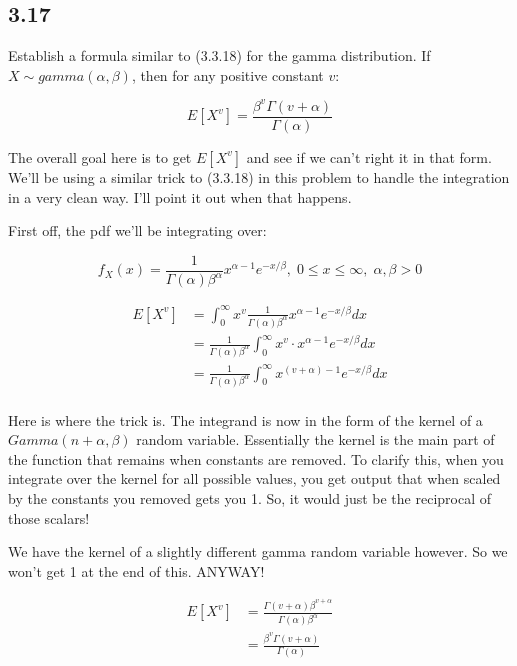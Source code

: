 \subsection*{3.17}

Establish a formula similar to (3.3.18) for the gamma distribution. If $X \sim gamma(\alpha, \beta)$, then for any positive constant $v$:

\[
	E[X^v] = \frac{\beta^v \Gamma(v + \alpha)}{\Gamma(\alpha)}
\]

The overall goal here is to get $E[X^v]$ and see if we can't right it in that form. We'll be using a similar trick to (3.3.18) in this problem to handle the integration in a very clean way. I'll point it out when that happens.

First off, the pdf we'll be integrating over:

\[
	f_X(x) = \frac{1}{\Gamma(\alpha)\beta^{\alpha}} x^{\alpha - 1} e^{-x/\beta}, \; 0 \leq x \leq \infty, \; \alpha, \beta > 0
\]

\begin{align*}
	E[X^v] &= \int_0^{\infty} x^v \frac{1}{\Gamma(\alpha)\beta^{\alpha}} x^{\alpha - 1} e^{-x/\beta} dx \\
	&=  \frac{1}{\Gamma(\alpha)\beta^{\alpha}} \int_0^{\infty} x^v \cdot x^{\alpha - 1} e^{-x/\beta} dx \\
	&=  \frac{1}{\Gamma(\alpha)\beta^{\alpha}} \int_0^{\infty} x^{(v+\alpha) - 1} e^{-x/\beta} dx \\ 
\end{align*}

Here is where the trick is. The integrand is now in the form of the kernel of a $Gamma(n+\alpha, \beta)$ random variable. Essentially the kernel is the main part of the function that remains when constants are removed. To clarify this, when you integrate over the kernel for all possible values, you get output that when scaled by the constants you removed gets you 1. So, it would just be the reciprocal of those scalars! 

We have the kernel of a slightly different gamma random variable however. So we won't get 1 at the end of this. ANYWAY!

\begin{align*}
	E[X^v] &= \frac{\Gamma(v + \alpha) \beta^{v+\alpha}}{\Gamma(\alpha) \beta^{\alpha}} \\
	&= \frac{\beta^{v} \Gamma(v + \alpha)}{\Gamma(\alpha)}
\end{align*}
